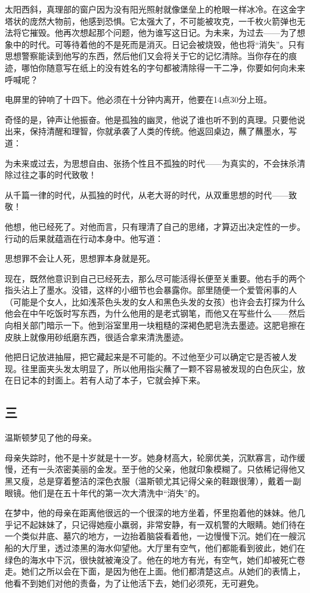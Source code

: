 太阳西斜，真理部的窗户因为没有阳光照射就像堡垒上的枪眼一样冰冷。在这金字塔状的庞然大物前，他感到恐惧。它太强大了，不可能被攻克，一千枚火箭弹也无法将它摧毁。他再次想起那个问题，他为谁写这日记。为未来，为过去------为了想象中的时代。可等待着他的不是死而是消灭。日记会被烧毁，他也将``消失''。只有思想警察能读到他写的东西，然后他们又会将关于它的记忆清除。当你存在的痕迹，哪怕你随意写在纸上的没有姓名的字句都被清除得一干二净，你要如何向未来呼喊呢？

电屏里的钟响了十四下。他必须在十分钟内离开，他要在14点30分上班。

奇怪的是，钟声让他振奋。他是孤独的幽灵，他说了谁也听不到的真理。只要他说出来，保持清醒和理智，你就承袭了人类的传统。他返回桌边，蘸了蘸墨水，写道：

为未来或过去，为思想自由、张扬个性且不孤独的时代------为真实的，不会抹杀清除过往之事的时代致敬！

从千篇一律的时代，从孤独的时代，从老大哥的时代，从双重思想的时代------致敬！

他想，他已经死了。对他而言，只有理清了自己的思绪，才算迈出决定性的一步。行动的后果就蕴涵在行动本身中。他写道：

思想罪不会让人死，思想罪本身就是死。

现在，既然他意识到自己已经死去，那么尽可能活得长便至关重要。他右手的两个指头沾上了墨水。没错，这样的小细节也会暴露你。部里随便一个爱管闲事的人（可能是个女人，比如浅茶色头发的女人和黑色头发的女孩）也许会去打探为什么他会在中午吃饭时写东西，为什么他用的是老式钢笔，而他又在写些什么------然后向相关部门暗示一下。他到浴室里用一块粗糙的深褐色肥皂洗去墨迹。这肥皂擦在皮肤上就像用砂纸磨东西，很适合拿来清洗墨迹。

他把日记放进抽屉，把它藏起来是不可能的。不过他至少可以确定它是否被人发现。往里面夹头发太明显了，所以他用指尖蘸了一颗不容易被发现的白色灰尘，放在日记本的封面上。若有人动了本子，它就会掉下来。

\subsection{三}\label{ux4e09}

温斯顿梦见了他的母亲。

母亲失踪时，他不是十岁就是十一岁。她身材高大，轮廓优美，沉默寡言，动作缓慢，还有一头浓密美丽的金发。至于他的父亲，他就印象模糊了。只依稀记得他又黑又瘦，总是穿着整洁的深色衣服（温斯顿尤其记得父亲的鞋跟很薄），戴着一副眼镜。他们是在五十年代的第一次大清洗中``消失''的。

在梦中，他的母亲在距离他很远的一个很深的地方坐着，怀里抱着他的妹妹。他几乎记不起妹妹了，只记得她瘦小羸弱，非常安静，有一双机警的大眼睛。她们待在一个类似井底、墓穴的地方，一边抬着脑袋看着他，一边慢慢下沉。她们在一艘沉船的大厅里，透过漆黑的海水仰望他。大厅里有空气，他们都能看到彼此，她们在绿色的海水中下沉，很快就被淹没了。他在的地方有光，有空气，她们却被死亡卷走。她们之所以会在下面，是因为他在上面。他们都清楚这点。从她们的表情上，他看不到她们对他的责备，为了让他活下去，她们必须死，无可避免。

